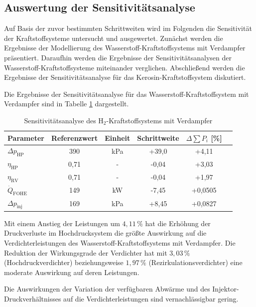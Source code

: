 \subsection{Auswertung der Sensitivitätsanalyse}

Auf Basis der zuvor bestimmten Schrittweiten wird im Folgenden die Sensitivität der Kraftstoffsysteme untersucht und ausgewertet. Zunächst werden die Ergebnisse der Modellierung des Wasserstoff-Kraftstoffsystems mit Verdampfer präsentiert. Daraufhin werden die Ergebnisse der Sensitivitätsanalysen der Wasserstoff-Kraftstoffsysteme miteinander verglichen. Abschließend werden die Ergebnisse der Sensitivitätsanalyse für das Kerosin-Kraftstoffsystem diskutiert. 

Die Ergebnisse der Sensitivitätsanalyse für das Wasserstoff-Kraftstoffsystem mit Verdampfer sind in Tabelle \ref{Tab:sensafter} dargestellt.

\begin{table}[ht]
	\centering
	\caption{Sensitivitätsanalyse des H$_2$-Kraftstoffsystems mit Verdampfer}
	\begin{tabular} {|l|c|c|c|c|c|} \hline%
		Parameter & Referenzwert & Einheit & Schrittweite & $ \Delta \sum P_i$ [\%] \\ \hline\hline%
		$\Delta p_\mathrm{HP}$ & 390 & \si{\kilo\Pa} & +39,0 & +4,11 \\ \hline 
		$\eta_\mathrm{HP}$ & 0,71 & - & -0,04 & +3,03 \\ \hline 
		$\eta_\mathrm{RV}$ & 0,71 & - & -0,04 & +1,97 \\ \hline 
		$\dot{Q}_\mathrm{FOHE}$ & 149 & \si{\kilo\W} & -7,45 & +0,0505 \\ \hline 
		$\Delta p_\mathrm{inj}$ & 169 & \si{\kilo\Pa} & +8,45 & +0,0827 \\ \hline 
	\end{tabular}	
	\label{Tab:sensafter}%
\end{table}
\FloatBarrier 

Mit einem Anstieg der Leistungen um  $4,11\,\%$ hat die Erhöhung der Druckverluste im Hochdrucksystem die größte Auswirkung auf die Verdichterleistungen des Wasserstoff-Kraftstoffsystems mit Verdampfer. Die Reduktion der Wirkungsgrade der Verdichter hat mit $3,03\,\%$ (Hochdruckverdichter) beziehungsweise $1,97\,\%$ (Rezirkulationsverdichter) eine moderate Auswirkung auf deren Leistungen.  

Die Auswirkungen der Variation der verfügbaren Abwärme und des Injektor-Druckverhältnisses auf die Verdichterleistungen sind vernachlässigbar gering.

